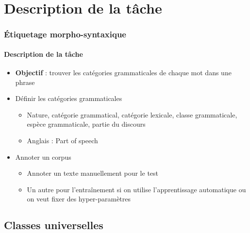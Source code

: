 \documentclass[xcolor=table]{beamer}
\begin{document}
\section{Description de la tâche}

\begin{frame}
\frametitle{Étiquetage morpho-syntaxique}
\framesubtitle{Description de la tâche}

\begin{itemize}
	\item \textbf{Objectif} : trouver les catégories grammaticales de chaque mot dans une phrase
	\item Définir les catégories grammaticales
	\begin{itemize}
		\item Nature, catégorie grammatical, catégorie lexicale, classe grammaticale, espèce grammaticale, partie du discours
		\item Anglais : Part of speech 
	\end{itemize}
	\item Annoter un corpus
	\begin{itemize}
		\item Annoter un texte manuellement pour le test
		\item Un autre pour l'entraînement si on utilise l'apprentissage automatique ou on veut fixer des hyper-paramètres
	\end{itemize}
\end{itemize}

\end{frame}

\subsection{Classes universelles}
\end{document}

